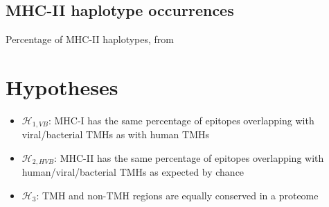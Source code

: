 
\subsection{MHC-II haplotype occurrences}

\begin{table}[!htbp]
  
  \caption{
    Percentage of MHC-II haplotypes, from \cite{greenbaum2011functional}
  }
  \label{table:mhc2_haplotypes}
\end{table}

\section{Hypotheses}


\begin{itemize}
  \item $\mathcal{H}_{1,VB}$: MHC-I has the same percentage of epitopes overlapping
    with viral/bacterial TMHs as with human TMHs
  \item $\mathcal{H}_{2,HVB}$: MHC-II has the same percentage of epitopes overlapping
    with human/viral/bacterial TMHs as expected by chance
  \item $\mathcal{H}_{3}$: TMH and non-TMH regions are equally conserved
    in a proteome
\end{itemize}

